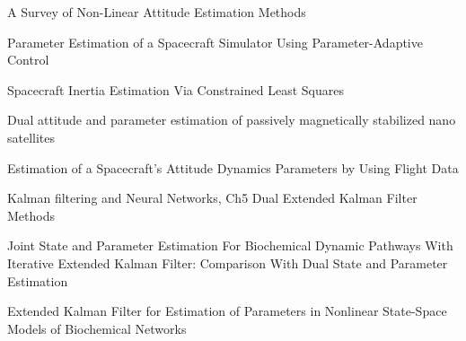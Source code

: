\documentclass[letterpaper, 10pt, conference]{ieeeconf}      %
\begin{document}

















\begin{thebibliography}{99}

 A Survey of Non-Linear Attitude Estimation Methods

 Parameter Estimation of a Spacecraft Simulator Using Parameter-Adaptive Control

 Spacecraft Inertia Estimation Via Constrained Least Squares

 Dual attitude and parameter estimation of passively magnetically stabilized nano satellites


 Estimation of a Spacecraft's Attitude Dynamics Parameters by Using Flight Data

 Kalman filtering and Neural Networks, Ch5 Dual Extended Kalman Filter Methods

 Joint State and Parameter Estimation For Biochemical Dynamic Pathways With Iterative Extended Kalman Filter: Comparison With Dual State and
Parameter Estimation

 Extended Kalman Filter for Estimation of Parameters in Nonlinear State-Space Models of Biochemical Networks
\end{thebibliography}
\end{document}
